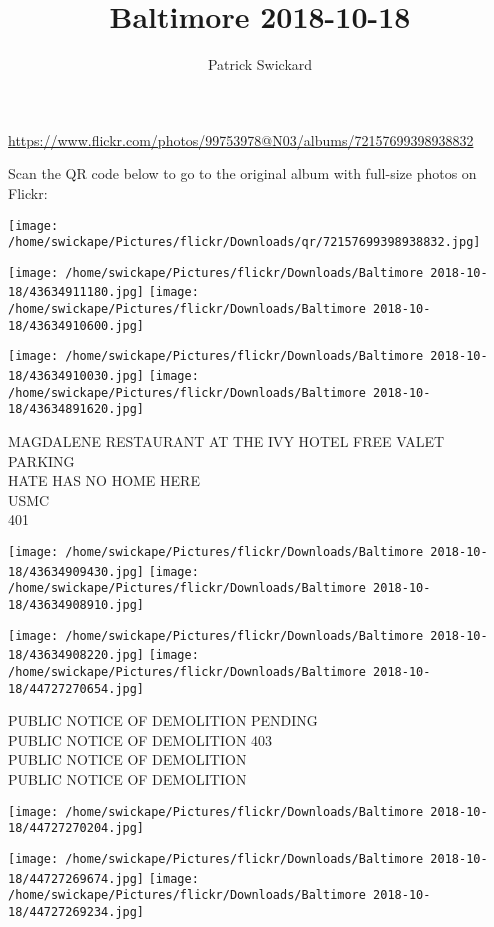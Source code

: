 \documentclass[10pt,letterpaper]{article}
\title{Baltimore 2018-10-18}
\author{Patrick Swickard}
\date{}
\begin{document}
\maketitle

\url{https://www.flickr.com/photos/99753978@N03/albums/72157699398938832}

Scan the QR code below to go to the original album with full-size photos on Flickr:

\texttt{[image: /home/swickape/Pictures/flickr/Downloads/qr/72157699398938832.jpg]}
\pagebreak

\texttt{[image: /home/swickape/Pictures/flickr/Downloads/Baltimore 2018-10-18/43634911180.jpg]}
\texttt{[image: /home/swickape/Pictures/flickr/Downloads/Baltimore 2018-10-18/43634910600.jpg]}

\texttt{[image: /home/swickape/Pictures/flickr/Downloads/Baltimore 2018-10-18/43634910030.jpg]}
\texttt{[image: /home/swickape/Pictures/flickr/Downloads/Baltimore 2018-10-18/43634891620.jpg]}

MAGDALENE RESTAURANT AT THE IVY HOTEL FREE VALET PARKING\\
HATE HAS NO HOME HERE\\
USMC\\
401
\pagebreak

\texttt{[image: /home/swickape/Pictures/flickr/Downloads/Baltimore 2018-10-18/43634909430.jpg]}
\texttt{[image: /home/swickape/Pictures/flickr/Downloads/Baltimore 2018-10-18/43634908910.jpg]}

\texttt{[image: /home/swickape/Pictures/flickr/Downloads/Baltimore 2018-10-18/43634908220.jpg]}
\texttt{[image: /home/swickape/Pictures/flickr/Downloads/Baltimore 2018-10-18/44727270654.jpg]}

PUBLIC NOTICE OF DEMOLITION PENDING\\
PUBLIC NOTICE OF DEMOLITION 403\\
PUBLIC NOTICE OF DEMOLITION\\
PUBLIC NOTICE OF DEMOLITION
\pagebreak

\texttt{[image: /home/swickape/Pictures/flickr/Downloads/Baltimore 2018-10-18/44727270204.jpg]}

\vspace{0.25in}
\texttt{[image: /home/swickape/Pictures/flickr/Downloads/Baltimore 2018-10-18/44727269674.jpg]}
\texttt{[image: /home/swickape/Pictures/flickr/Downloads/Baltimore 2018-10-18/44727269234.jpg]}
\end{document}
